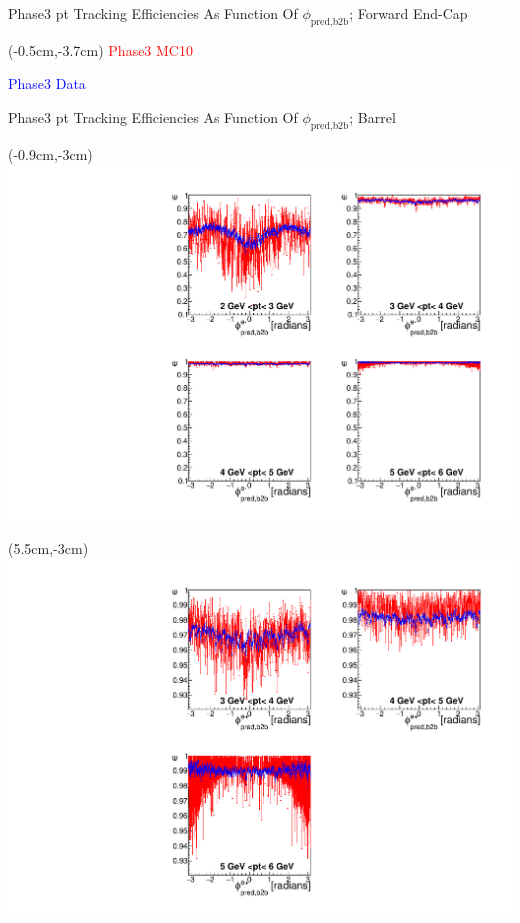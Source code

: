 \documentclass[8pt]{beamer}
\begin{document}
\begin{frame}{Phase3 pt Tracking Efficiencies As Function Of $\phi_{\textrm{pred,b2b}}$; Forward End-Cap}
\begin{textblock*}{6.5cm}
\begin{picture}
		\end{picture}
		
	\end{textblock*}
	
	
	
	\begin{textblock*}{4cm}(-0.5cm,-3.7cm)
		\textcolor{red}{Phase3 MC10}
		
		\textcolor{blue}{Phase3 Data}
	\end{textblock*}
	
	
	
	
	
	
	
	
\end{frame}

\begin{frame}{Phase3 pt Tracking Efficiencies As Function Of $\phi_{\textrm{pred,b2b}}$; Barrel}
	
	
	\begin{textblock*}{6.5cm}(-0.9cm,-3cm)
		\includegraphics[width=\textwidth]{VPlots/P3/xPtMPhiemBarrelP3}
	\end{textblock*}
	
	\begin{textblock*}{6.5cm}(5.5cm,-3cm)
		\includegraphics[width=\textwidth]{VPlots/P3/xPtMPhiepBarrelP3}
	\end{textblock*}
	

\end{frame}
\end{document}
